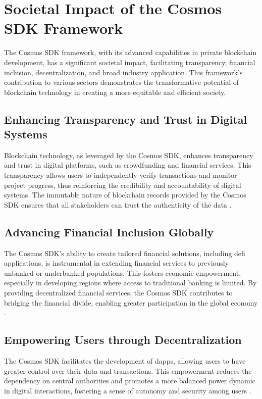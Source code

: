 \section{Societal Impact of the Cosmos SDK Framework}

The Cosmos SDK framework, with its advanced capabilities in private blockchain development, has a significant societal impact, facilitating transparency, financial inclusion, decentralization, and broad industry application. This framework's contribution to various sectors demonstrates the transformative potential of blockchain technology in creating a more equitable and efficient society.

\subsection{Enhancing Transparency and Trust in Digital Systems}

Blockchain technology, as leveraged by the Cosmos SDK, enhances transparency and trust in digital platforms, such as crowdfunding and financial services. This transparency allows users to independently verify transactions and monitor project progress, thus reinforcing the credibility and accountability of digital systems. The immutable nature of blockchain records provided by the Cosmos SDK ensures that all stakeholders can trust the authenticity of the data \cite{Aljumah2023}.

\subsection{Advancing Financial Inclusion Globally}

The Cosmos SDK's ability to create tailored financial solutions, including \gls{defi} applications, is instrumental in extending financial services to previously unbanked or underbanked populations. This fosters economic empowerment, especially in developing regions where access to traditional banking is limited. By providing decentralized financial services, the Cosmos SDK contributes to bridging the financial divide, enabling greater participation in the global economy \cite{Princeton2023}.

\subsection{Empowering Users through Decentralization}

The Cosmos SDK facilitates the development of \gls{dapps}, allowing users to have greater control over their data and transactions. This empowerment reduces the dependency on central authorities and promotes a more balanced power dynamic in digital interactions, fostering a sense of autonomy and security among users \cite{Aljumah2023}.

